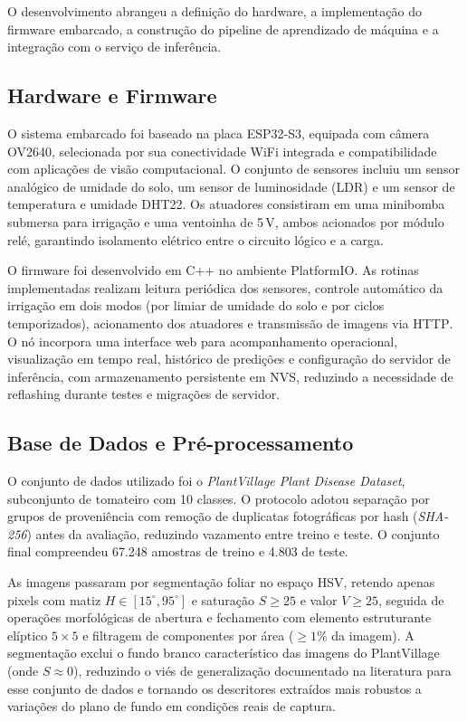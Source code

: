 \documentclass[12pt]{article}
\providecommand{\gls}[1]{\textnormal{\textsc{#1}}}
\begin{document}
O desenvolvimento abrangeu a definição do hardware, a implementação do
firmware embarcado, a construção do pipeline de aprendizado de máquina e a
integração com o serviço de inferência.

\subsection{Hardware e Firmware}

O sistema embarcado foi baseado na placa \gls{ESP32}-S3, equipada com câmera
\gls{OV2640}, selecionada por sua conectividade WiFi integrada e
compatibilidade com aplicações de visão computacional. O conjunto de sensores
incluiu um sensor analógico de umidade do solo, um sensor de luminosidade
(\gls{LDR}) e um sensor de temperatura e umidade \gls{DHT22}. Os atuadores
consistiram em uma minibomba submersa para irrigação e uma ventoinha de 5\,V,
ambos acionados por módulo relé, garantindo isolamento elétrico entre o
circuito lógico e a carga.

O firmware foi desenvolvido em C++ no ambiente PlatformIO. As rotinas
implementadas realizam leitura periódica dos sensores, controle automático da
irrigação em dois modos (por limiar de umidade do solo e por ciclos
temporizados), acionamento dos atuadores e transmissão de imagens via
\gls{HTTP}. O nó incorpora uma interface web para acompanhamento operacional,
visualização em tempo real, histórico de predições e configuração do servidor
de inferência, com armazenamento persistente em NVS, reduzindo a necessidade
de reflashing durante testes e migrações de servidor.

\subsection{Base de Dados e Pré-processamento}

O conjunto de dados utilizado foi o \textit{PlantVillage Plant Disease
Dataset}, subconjunto de tomateiro com 10 classes. O protocolo adotou
separação por grupos de proveniência com remoção de duplicatas fotográficas
por hash (\textit{SHA-256}) antes da avaliação, reduzindo vazamento entre
treino e teste. O conjunto final compreendeu 67.248 amostras de treino e
4.803 de teste.

As imagens passaram por segmentação foliar no espaço \gls{HSV}, retendo
apenas pixels com matiz $H \in [15^\circ, 95^\circ]$ e saturação $S \geq 25$
e valor $V \geq 25$, seguida de operações morfológicas de abertura e
fechamento com elemento estruturante elíptico $5\times5$ e filtragem de
componentes por área ($\geq 1\%$ da imagem). A segmentação exclui o fundo
branco característico das imagens do PlantVillage (onde $S \approx 0$),
reduzindo o viés de generalização documentado na literatura para esse conjunto
de dados e tornando os descritores extraídos mais robustos a variações do
plano de fundo em condições reais de captura.
\end{document}

